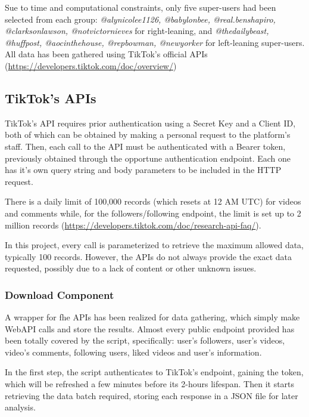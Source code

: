 Sue to time and computational constraints, only five super-users had been selected from each group: \textit{@alynicolee1126, @babylonbee, @real.benshapiro, @clarksonlawson, @notvictornieves} for right-leaning, and \textit{@thedailybeast, @huffpost, @aocinthehouse, @repbowman, @newyorker} for left-leaning super-users. \\
All data has been gathered using TikTok's official APIs (\url{https://developers.tiktok.com/doc/overview/})

\subsection{TikTok's APIs}

TikTok's API requires prior authentication using a Secret Key and a Client ID, both of which can be obtained by making a personal request to the platform's staff. 
Then, each call to the API must be authenticated with a Bearer token, previously obtained through the opportune authentication endpoint. Each one has it's own query string and body parameters to be included in the HTTP request.

There is a daily limit of 100,000 records (which resets at 12 AM UTC) for videos and comments while, for the followers/following endpoint, the limit is set up to 2 million records (\url{https://developers.tiktok.com/doc/research-api-faq/}).

In this project, every call is parameterized to retrieve the maximum allowed data, typically 100 records. However, the APIs do not always provide the exact data requested, possibly due to a lack of content or other unknown issues.

\subsubsection*{Download Component}

A wrapper for fhe APIs has been realized for data gathering, which simply make WebAPI calls and store the results.
Almost every public endpoint provided has been totally covered by the script, specifically: user's followers, user's videos, video's comments, following users, liked videos and user's information.

In the first step, the script authenticates to TikTok's endpoint, gaining the token, which will be refreshed a few minutes before its 2-hours lifespan. Then it starts retrieving the data batch required, storing each response in a JSON file for later analysis.

